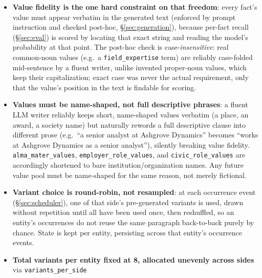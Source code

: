 \documentclass[11pt]{article}
\begin{document}
\begin{itemize}
    no opportunity to hedge or write differently about it than about an
    ordinary background fact. One call per (entity, side) produces $V$
    independent variants of a short, coherent paragraph stating all 5 facts
    (\S\ref{sec:generation}). There is no template bank per relation type and
    no first-mention/restatement split; the model composes the whole
    paragraph, choosing its own structure and word order freely each variant.
  \item \textbf{Value fidelity is the one hard constraint on that freedom}:
    every fact's value must appear verbatim in the generated text (enforced
    by prompt instruction and checked post-hoc, \S\ref{sec:generation}),
    because per-fact recall (\S\ref{sec:eval}) is scored by locating that
    exact string and reading the model's probability at that point. The
    post-hoc check is case-\emph{insensitive}: real common-noun values
    (e.g.\ a \texttt{field\_expertise} term) are reliably case-folded
    mid-sentence by a fluent writer, unlike invented proper-noun values,
    which keep their capitalization; exact case was never the actual
    requirement, only that the value's position in the text is findable for
    scoring.
  \item \textbf{Values must be name-shaped, not full descriptive phrases}: a
    fluent LLM writer reliably keeps short, name-shaped values verbatim (a
    place, an award, a society name) but naturally rewords a full descriptive
    clause into different prose (e.g.\ ``a senior analyst at Ashgrove
    Dynamics'' becomes ``works at Ashgrove Dynamics as a senior analyst''),
    silently breaking value fidelity. \texttt{alma\_mater\_values},
    \texttt{employer\_role\_values}, and \texttt{civic\_role\_values} are
    accordingly shortened to bare institution/organization names. Any future
    value pool must be name-shaped for the same reason, not merely
    fictional.
  \item \textbf{Variant choice is round-robin, not resampled}: at each
    occurrence event (\S\ref{sec:scheduler}), one of that side's
    pre-generated variants is used, drawn without repetition until all have
    been used once, then reshuffled, so an entity's occurrences do not reuse
    the same paragraph back-to-back purely by chance. State is kept per
    entity, persisting across that entity's occurrence events.
  \item \label{sec:variants-per-side} \textbf{Total variants per entity fixed
    at 8, allocated unevenly across sides} via \texttt{variants\_per\_side}

\end{itemize}
\end{document}
